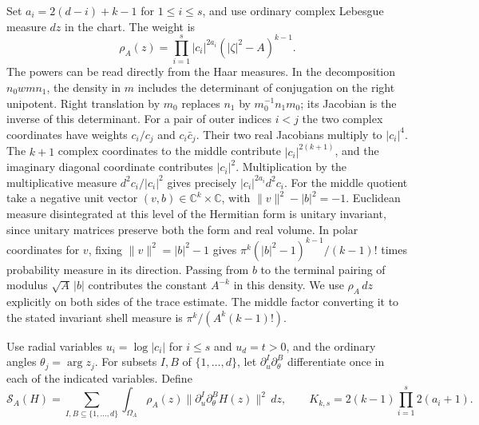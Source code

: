 \documentclass[a4paper,11pt]{article}
\theoremstyle{definition}
\theoremstyle{remark}
\numberwithin{equation}{section}
\begin{document}
Set \(a_i=2(d-i)+k-1\) for \(1\le i\le s\), and use ordinary
complex Lebesgue measure \(dz\) in the chart. The weight is
\[
  \rho_A(z)=\prod_{i=1}^s |c_i|^{2a_i}
                        (|\zeta|^2-A)^{k-1}.
\]
The powers can be read directly from the Haar measures. In the
decomposition \(n_0 w m n_1\), the density in \(m\) includes
the determinant of conjugation on the right unipotent. Right
translation by \(m_0\) replaces \(n_1\) by \(m_0^{-1}n_1m_0\);
its Jacobian is the inverse of this determinant. For a pair of
outer indices \(i<j\) the two complex coordinates have weights
\(c_i/c_j\) and \(c_i\bar c_j\). Their two real Jacobians
multiply to \(|c_i|^4\). The \(k+1\) complex coordinates to the
middle contribute \(|c_i|^{2(k+1)}\), and the imaginary diagonal
coordinate contributes \(|c_i|^2\). Multiplication by the
multiplicative measure \(d^2c_i/|c_i|^2\) gives precisely
\(|c_i|^{2a_i}d^2c_i\). For the middle quotient take a negative
unit vector \((v,b)\in\mathbb C^k\times\mathbb C\), with
\(\|v\|^2-|b|^2=-1\). Euclidean measure disintegrated at this
level of the Hermitian form is unitary invariant, since unitary
matrices preserve both the form and real volume. In polar
coordinates for \(v\), fixing \(\|v\|^2=|b|^2-1\) gives
\(\pi^k(|b|^2-1)^{k-1}/(k-1)!\) times probability measure in
its direction. Passing from \(b\) to the terminal pairing of
modulus \(\sqrt A\,|b|\) contributes the constant \(A^{-k}\)
in this density. We use \(\rho_A\,dz\) explicitly on both sides
of the trace estimate. The middle factor converting it to the
stated invariant shell measure is \(\pi^k/(A^k(k-1)!)\).

Use radial variables \(u_i=\log|c_i|\) for \(i\le s\) and
\(u_d=t>0\), and the ordinary angles \(\theta_j=\arg z_j\).
For subsets \(I,B\) of \(\{1,\ldots,d\}\), let
\(\partial_u^I\partial_\theta^B\) differentiate once in each
of the indicated variables. Define
\[
 \mathcal S_A(H)=\sum_{I,B\subseteq\{1,\ldots,d\}}
       \int_{\Omega_A}\rho_A(z)
       \|\partial_u^I\partial_\theta^B H(z)\|^2\,dz,
 \qquad
 K_{k,s}=2(k-1)\prod_{i=1}^s 2(a_i+1).
\]
\end{document}

